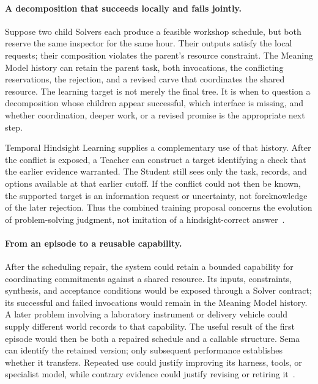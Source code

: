 \documentclass[10pt]{article}
\begin{document}
\paragraph{A decomposition that succeeds locally and fails jointly.}
Suppose two child Solvers each produce a feasible workshop schedule, but both
reserve the same inspector for the same hour. Their outputs satisfy the local
requests; their composition violates the parent's resource constraint. The
Meaning Model history can retain the parent task, both invocations, the
conflicting reservations, the rejection, and a revised carve that coordinates
the shared resource. The learning target is not merely the final tree. It is
when to question a decomposition whose children appear successful, which
interface is missing, and whether coordination, deeper work, or a revised
promise is the appropriate next step.

Temporal Hindsight Learning supplies a complementary use of that history.
After the conflict is exposed, a Teacher can construct a target identifying a
check that the earlier evidence warranted. The Student still sees only the
task, records, and options available at that earlier cutoff. If the conflict
could not then be known, the supported target is an information request or
uncertainty, not foreknowledge of the later rejection. Thus the combined
training proposal concerns the evolution of problem-solving judgment, not
imitation of a hindsight-correct answer~\cite{westerbergTHL2026}.

\paragraph{From an episode to a reusable capability.}
After the scheduling repair, the system could retain a bounded capability for
coordinating commitments against a shared resource. Its inputs, constraints,
synthesis, and acceptance conditions would be exposed through a Solver
contract; its successful and failed invocations would remain in the Meaning
Model history. A later problem involving a laboratory instrument or delivery
vehicle could supply different world records to that capability. The useful
result of the first episode would then be both a repaired schedule and a
callable structure. Sema can identify the retained version; only subsequent
performance establishes whether it transfers. Repeated use could justify
improving its harness, tools, or specialist model, while contrary evidence
could justify revising or retiring it~\cite{westerbergFractal2026}.
\end{document}
